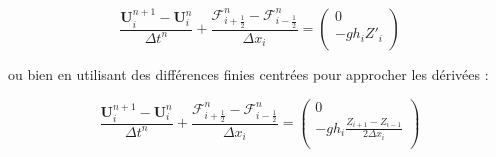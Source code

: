 \documentclass[
11pt, %
francais, %
singlespacing, %
headsepline, %
]{MastersDoctoralThesis} %
\begin{document}
\[\frac{\textbf{U}_i^{n+1}-\textbf{U}_i^{n}}{\Delta t^n}+\frac{\mathcal{F}_{i+\frac{1}{2}}^n - \mathcal{F}_{i-\frac{1}{2}}^n}{\Delta x_i}= \begin{pmatrix}
0 \\
-gh_i Z'_i\\
\end{pmatrix}\]

ou bien en utilisant des différences finies centrées pour approcher les
dérivées :

\[\frac{\textbf{U}_i^{n+1}-\textbf{U}_i^{n}}{\Delta t^n}+\frac{\mathcal{F}_{i+\frac{1}{2}}^n - \mathcal{F}_{i-\frac{1}{2}}^n}{\Delta x_i}= \begin{pmatrix}
0 \\
-gh_i \frac{Z_{i+1}-Z_{i-1}}{2\Delta x_i}\\
\end{pmatrix}\]
\end{document}
